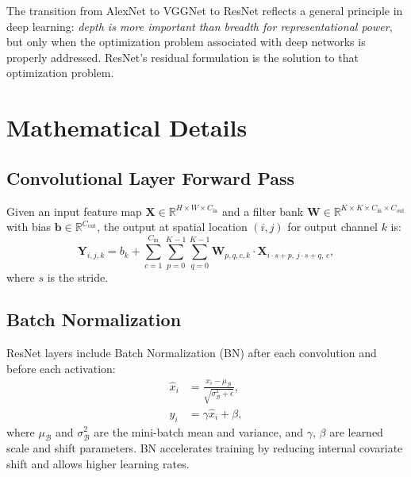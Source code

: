 \documentclass[12pt,a4paper]{article}
\begin{document}
\begin{keyinsight}
The transition from AlexNet to VGGNet to ResNet reflects a general principle in deep learning: \emph{depth is more important than breadth for representational power}, but only when the optimization problem associated with deep networks is properly addressed. ResNet's residual formulation is the solution to that optimization problem.
\end{keyinsight}

\section{Mathematical Details}
\label{sec:math}

\subsection{Convolutional Layer Forward Pass}

Given an input feature map $\mathbf{X} \in \mathbb{R}^{H \times W \times C_{\text{in}}}$ and a filter bank $\mathbf{W} \in \mathbb{R}^{K \times K \times C_{\text{in}} \times C_{\text{out}}}$ with bias $\mathbf{b} \in \mathbb{R}^{C_{\text{out}}}$, the output at spatial location $(i,j)$ for output channel $k$ is:
\begin{equation}
  \mathbf{Y}_{i,j,k} = b_k + \sum_{c=1}^{C_{\text{in}}} \sum_{p=0}^{K-1} \sum_{q=0}^{K-1}
    \mathbf{W}_{p,q,c,k} \cdot \mathbf{X}_{i\cdot s + p,\, j\cdot s + q,\, c},
  \label{eq:conv}
\end{equation}
where $s$ is the stride.

\subsection{Batch Normalization}

ResNet layers include Batch Normalization (BN) after each convolution and before each activation:
\begin{align}
  \hat{x}_i &= \frac{x_i - \mu_\mathcal{B}}{\sqrt{\sigma^2_\mathcal{B} + \epsilon}},
  \label{eq:bn_norm}\\
  y_i &= \gamma \hat{x}_i + \beta,
  \label{eq:bn_scale}
\end{align}
where $\mu_\mathcal{B}$ and $\sigma^2_\mathcal{B}$ are the mini-batch mean and variance, and $\gamma$, $\beta$ are learned scale and shift parameters. BN accelerates training by reducing internal covariate shift and allows higher learning rates.
\end{document}
